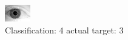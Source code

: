 \begin{figure}[h!]
\begin{center}
\includegraphics[width=0.60\columnwidth]{figures/ID2140_class_4_target_3.png}
\end{center}
\caption{ Classification: 4 actual target: 3}
\label{fig:ID2140_class_4_target_3}
\end{figure}
